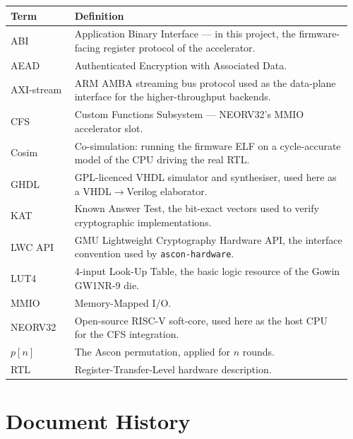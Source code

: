 \documentclass[11pt,a4paper]{article}
\begin{document}
\begin{center}
\small
\begin{tabular}{p{0.18\linewidth}p{0.78\linewidth}}
\toprule
\rowcolor{tabhead!20}\textbf{Term} & \textbf{Definition}\\
\midrule
ABI            & Application Binary Interface --- in this project, the firmware-facing register protocol of the accelerator.\\
AEAD           & Authenticated Encryption with Associated Data.\\
AXI-stream     & ARM AMBA streaming bus protocol used as the data-plane interface for the higher-throughput backends.\\
CFS            & Custom Functions Subsystem --- NEORV32's MMIO accelerator slot.\\
Cosim          & Co-simulation: running the firmware ELF on a cycle-accurate model of the CPU driving the real RTL.\\
GHDL           & GPL-licenced VHDL simulator and synthesiser, used here as a VHDL$\to$Verilog elaborator.\\
KAT            & Known Answer Test, the bit-exact vectors used to verify cryptographic implementations.\\
LWC API        & GMU Lightweight Cryptography Hardware API, the interface convention used by \texttt{ascon-hardware}.\\
LUT4           & 4-input Look-Up Table, the basic logic resource of the Gowin GW1NR-9 die.\\
MMIO           & Memory-Mapped I/O.\\
NEORV32        & Open-source RISC-V soft-core, used here as the host CPU for the CFS integration.\\
$p[n]$         & The Ascon permutation, applied for $n$ rounds.\\
RTL            & Register-Transfer-Level hardware description.\\
\bottomrule
\end{tabular}
\end{center}

\section{Document History}
\end{document}
